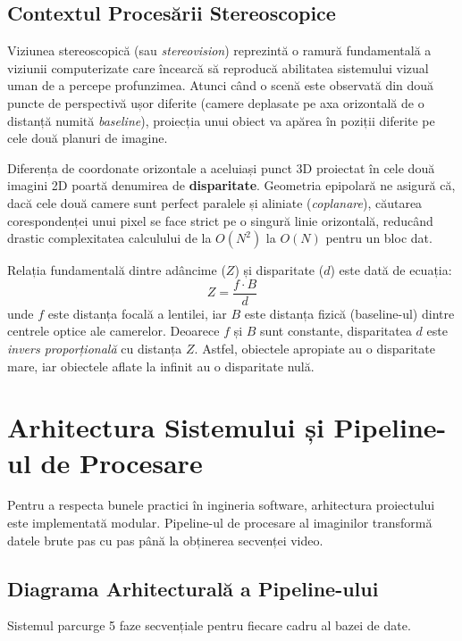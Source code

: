 \documentclass[12pt,a4paper]{report}
\begin{document}
\section{Contextul Procesării Stereoscopice}
Viziunea stereoscopică (sau \textit{stereovision}) reprezintă o ramură fundamentală a viziunii computerizate care încearcă să reproducă abilitatea sistemului vizual uman de a percepe profunzimea. Atunci când o scenă este observată din două puncte de perspectivă ușor diferite (camere deplasate pe axa orizontală de o distanță numită \textit{baseline}), proiecția unui obiect va apărea în poziții diferite pe cele două planuri de imagine. 

Diferența de coordonate orizontale a aceluiași punct 3D proiectat în cele două imagini 2D poartă denumirea de \textbf{disparitate}. Geometria epipolară ne asigură că, dacă cele două camere sunt perfect paralele și aliniate (\textit{coplanare}), căutarea corespondenței unui pixel se face strict pe o singură linie orizontală, reducând drastic complexitatea calculului de la $O(N^2)$ la $O(N)$ pentru un bloc dat.

Relația fundamentală dintre adâncime ($Z$) și disparitate ($d$) este dată de ecuația:
\begin{equation}
    Z = \frac{f \cdot B}{d}
\end{equation}
unde $f$ este distanța focală a lentilei, iar $B$ este distanța fizică (baseline-ul) dintre centrele optice ale camerelor. Deoarece $f$ și $B$ sunt constante, disparitatea $d$ este \textit{invers proporțională} cu distanța $Z$. Astfel, obiectele apropiate au o disparitate mare, iar obiectele aflate la infinit au o disparitate nulă.

\chapter{Arhitectura Sistemului și Pipeline-ul de Procesare}

Pentru a respecta bunele practici în ingineria software, arhitectura proiectului este implementată modular. Pipeline-ul de procesare al imaginilor transformă datele brute pas cu pas până la obținerea secvenței video.

\section{Diagrama Arhitecturală a Pipeline-ului}
Sistemul parcurge 5 faze secvențiale pentru fiecare cadru al bazei de date.
\end{document}

